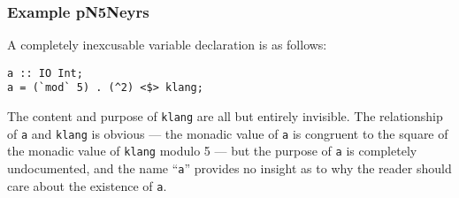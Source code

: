 \documentclass{report}
\begin{document}
\subsubsection{Example pN5Neyrs}
A completely inexcusable variable declaration is as follows:
\begin{lstlisting}
a :: IO Int;
a = (`mod` 5) . (^2) <$> klang;
\end{lstlisting}
The content and purpose of \texttt{klang} are all but entirely invisible.  The relationship of \texttt{a} and \texttt{klang} is obvious --- the monadic value of \texttt{a} is congruent to the square of the monadic value of \texttt{klang} modulo 5 --- but the purpose of \texttt{a} is completely undocumented, and the name ``\texttt{a}'' provides no insight as to why the reader should care about the existence of \texttt{a}.
\end{document}

